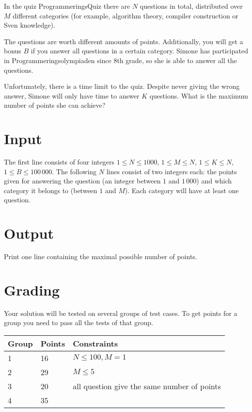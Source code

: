 In the quiz ProgrammeringsQuiz there are $N$ questions in total, distributed over $M$ different categories (for example, algorithm theory, compiler construction or Sven knowledge).

The questions are worth different amounts of points. Additionally, you will get a bonus $B$ if you answer all questions in a certain category.
Simone has participated in Programmeringsolympiaden since 8th grade, so she is able to answer all the questions.

Unfortunately, there is a time limit to the quiz. Despite never giving the wrong answer, Simone will only have time to answer $K$ questions. What is the maximum number of points she can achieve?
\section*{Input}
The first line consists of four integers $1 \le N \le 1000$, $1 \le M \le N$, $1 \le K \le N$, $1 \le B \le 100\,000$.
The following $N$ lines consist of two integers each: the points given for answering the question (an integer between $1$ and $1\,000$) and which category it belongs to (between $1$ and $M$).
Each category will have at least one question.
\section*{Output}
Print one line containing the maximal possible number of points.
\section*{Grading}
Your solution will be tested on several groups of test cases. To get points for a group you need to pass all the tests of that group.

\begin{tabular}{| l | l | l |}
  \hline
  Group & Points & Constraints\\ \hline
  1     & 16         & $N \le 100, M = 1$ \\ \hline
  2     & 29         & $M \le 5$ \\ \hline
  3     & 20         & all question give the same number of points \\ \hline
  4     & 35         & \\ \hline
\end{tabular}
